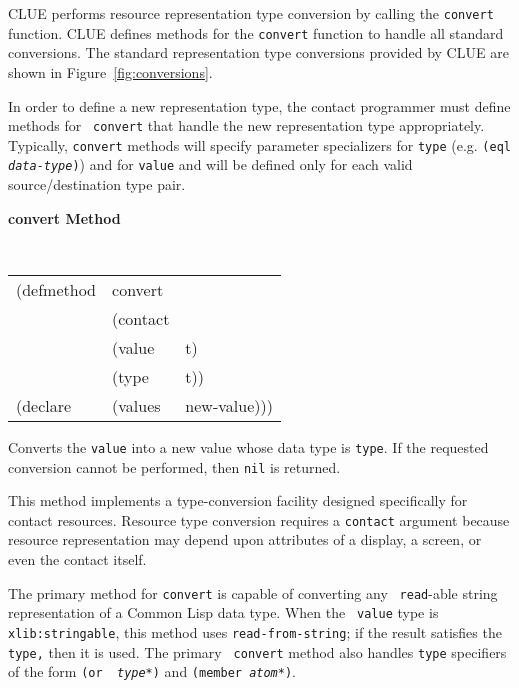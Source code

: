 CLUE performs resource representation type conversion by calling the
{\tt convert} function.  
CLUE defines methods for the {\tt convert} function to handle all standard
conversions. 
The standard representation type conversions provided by CLUE are shown
in Figure~\ref{fig:conversions}.

In order
to define a new representation type, the contact programmer must define
methods for {\tt
convert} that handle the new representation type appropriately. Typically,
{\tt convert} methods will specify parameter specializers for {\tt type}
(e.g. {\tt (eql {\em data-type})}) and for {\tt value} and will be defined only
for each valid source/destination type pair. 


{\large {\bf convert \hfill Method}}
\begin{flushright}
\parbox[t]{6.125in}{
\tt
\begin{tabular}{lll}
\raggedright
(defmethod & convert & \\
& (contact\\
& (value & t)\\
& (type  & t))\\
(declare &(values &new-value)))
\end{tabular}
\rm

Converts the {\tt value} into a new value whose data type is {\tt type}. If the
requested conversion cannot be performed, then {\tt nil} is returned.
 
This
method implements a type-conversion facility designed specifically for contact
resources.
Resource type conversion requires a {\tt contact} argument because resource
representation may depend upon attributes of a display, a screen, or even the
contact itself. 

The primary method for {\tt convert} is capable of converting any {\tt
read}-able string representation of a Common Lisp data type.  When the {\tt
value} type is {\tt xlib:stringable}, this method uses {\tt read-from-string};
if the result satisfies the {\tt type,} then it is used. The primary {\tt
convert} method also handles {\tt type} specifiers of the form {\tt (or {\em
type*})} and {\tt (member {\em atom*})}.

}\end{flushright}

